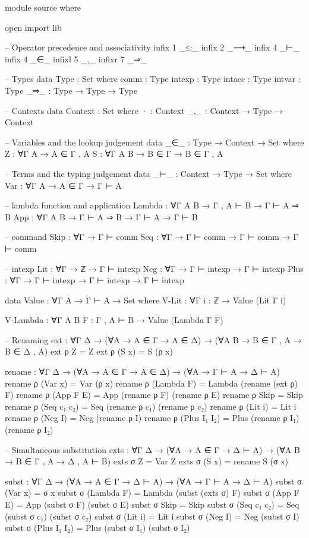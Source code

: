 \documentclass{article}
\begin{document}
\begin{code}
module source where

open import lib

-- Operator precedence and associativity
infix 1 _≤:_
infix 2 _⟶_ 
infix 4 _⊢_
infix 4 _∈_
infixl 5 _,_
infixr 7 _⇒_

-- Types
data Type : Set where
    comm : Type
    intexp : Type
    intacc : Type
    intvar : Type
    _⇒_ : Type  →  Type  →  Type

-- Contexts
data Context : Set where
    · : Context
    _,_ : Context  →  Type  →  Context

-- Variables and the lookup judgement
data _∈_ : Type  →  Context  →  Set where
    Z : ∀{Γ A}  →  A ∈ Γ , A
    S : ∀{Γ A B}  →  B ∈ Γ  →  B ∈ Γ , A

-- Terms and the typing judgement
data _⊢_ : Context  →  Type  →  Set where
    Var : ∀{Γ A}  →  A ∈ Γ  →  Γ ⊢ A

    -- lambda function and application
    Lambda : ∀{Γ A B}  →  Γ , A ⊢ B  →  Γ ⊢ A ⇒ B
    App : ∀{Γ A B}  →  Γ ⊢ A ⇒ B  →  Γ ⊢ A  →  Γ ⊢ B

    -- command
    Skip : ∀{Γ} → Γ ⊢ comm
    Seq : ∀{Γ} → Γ ⊢ comm → Γ ⊢ comm → Γ ⊢ comm

    -- intexp
    Lit : ∀{Γ} → ℤ → Γ ⊢ intexp
    Neg : ∀{Γ} → Γ ⊢ intexp → Γ ⊢ intexp
    Plus : ∀{Γ} → Γ ⊢ intexp → Γ ⊢ intexp → Γ ⊢ intexp


data Value : ∀{Γ A}  →  Γ ⊢ A  →  Set where
    V-Lit : ∀{Γ} {i : ℤ} → Value (Lit {Γ} i)

    V-Lambda : ∀{Γ A B} {F : Γ , A ⊢ B}  →  Value (Lambda {Γ} F)

-- Renaming
ext : ∀{Γ Δ}  →  (∀{A}  →  A ∈ Γ  →  A ∈ Δ)  →  (∀{A B}  →  B ∈ Γ , A  →  B ∈ Δ , A)
ext ρ Z = Z
ext ρ (S x) = S (ρ x)

rename : ∀{Γ Δ}  →  (∀{A}  →  A ∈ Γ  →  A ∈ Δ)  →  (∀{A}  →  Γ ⊢ A  →  Δ ⊢ A)
rename ρ (Var x) = Var (ρ x)
rename ρ (Lambda F) = Lambda (rename (ext ρ) F)
rename ρ (App F E) = App (rename ρ F) (rename ρ E)
rename ρ Skip = Skip
rename ρ (Seq c₁ c₂) = Seq (rename ρ c₁) (rename ρ c₂)
rename ρ (Lit i) = Lit i
rename ρ (Neg I) = Neg (rename ρ I)
rename ρ (Plus I₁ I₂) = Plus (rename ρ I₁) (rename ρ I₂)

-- Simultaneous substitution
exts : ∀{Γ Δ}  →  (∀{A}  →  A ∈ Γ  →  Δ ⊢ A)  →  (∀{A B}  →  B ∈ Γ , A  →  Δ , A ⊢ B)
exts σ Z = Var Z
exts σ (S x) = rename S (σ x)

subst : ∀{Γ Δ}  →  (∀{A}  →  A ∈ Γ  →  Δ ⊢ A)  →  (∀{A}  →  Γ ⊢ A  →  Δ ⊢ A)
subst σ (Var x) = σ x
subst σ (Lambda F) = Lambda (subst (exts σ) F)
subst σ (App F E) = App (subst σ F) (subst σ E)
subst σ Skip = Skip
subst σ (Seq c₁ c₂) = Seq (subst σ c₁) (subst σ c₂)
subst σ (Lit i) = Lit i
subst σ (Neg I) = Neg (subst σ I)
subst σ (Plus I₁ I₂) = Plus (subst σ I₁) (subst σ I₂)


\end{code}
\end{document}
